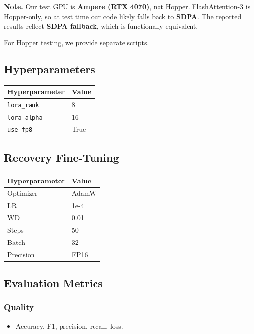 \textbf{Note.} Our test GPU is \textbf{Ampere (RTX 4070)}, not Hopper. FlashAttention-3 
is Hopper-only, so at test time our code likely falls back to \textbf{SDPA}. 
The reported results reflect \textbf{SDPA fallback}, which is functionally 
equivalent.

For Hopper testing, we provide separate scripts.

\subsection{Hyperparameters}

\begin{table}[H]
\centering
\small
\begin{tabular}{ll}
\toprule
\textbf{Hyperparameter} & \textbf{Value} \\
\midrule
\texttt{lora\_rank} & 8 \\
\texttt{lora\_alpha} & 16 \\
\texttt{use\_fp8} & True \\
\bottomrule
\end{tabular}
\end{table}

\subsection{Recovery Fine-Tuning}

\begin{table}[H]
\centering
\small
\begin{tabular}{ll}
\toprule
\textbf{Hyperparameter} & \textbf{Value} \\
\midrule
Optimizer & AdamW \\
LR & 1e-4 \\
WD & 0.01 \\
Steps & 50 \\
Batch & 32 \\
Precision & FP16 \\
\bottomrule
\end{tabular}
\end{table}

\subsection{Evaluation Metrics}

\subsubsection{Quality}
\begin{itemize}
\item Accuracy, F1, precision, recall, loss.

\end{itemize}
